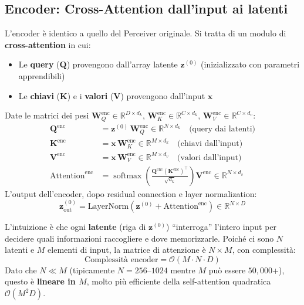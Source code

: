 \documentclass[12pt,a4paper]{article}
\begin{document}
\subsection{Encoder: Cross-Attention dall'input ai latenti}

L'encoder \`e identico a quello del Perceiver originale. Si tratta di un modulo di \textbf{cross-attention} in cui:
\begin{itemize}
    \item Le \textbf{query} ($\mathbf{Q}$) provengono dall'array latente $\mathbf{z}^{(0)}$ (inizializzato con parametri apprendibili)
    \item Le \textbf{chiavi} ($\mathbf{K}$) e i \textbf{valori} ($\mathbf{V}$) provengono dall'input $\mathbf{x}$
\end{itemize}

\begin{formulabox}
Date le matrici dei pesi $\mathbf{W}_Q^{\text{enc}} \in \mathbb{R}^{D \times d_k}$, $\mathbf{W}_K^{\text{enc}} \in \mathbb{R}^{C \times d_k}$, $\mathbf{W}_V^{\text{enc}} \in \mathbb{R}^{C \times d_v}$:
\begin{align}
    \mathbf{Q}^{\text{enc}} &= \mathbf{z}^{(0)} \, \mathbf{W}_Q^{\text{enc}} \in \mathbb{R}^{N \times d_k} \quad \text{(query dai latenti)} \\
    \mathbf{K}^{\text{enc}} &= \mathbf{x} \, \mathbf{W}_K^{\text{enc}} \in \mathbb{R}^{M \times d_k} \quad \text{(chiavi dall'input)} \\
    \mathbf{V}^{\text{enc}} &= \mathbf{x} \, \mathbf{W}_V^{\text{enc}} \in \mathbb{R}^{M \times d_v} \quad \text{(valori dall'input)} \\[6pt]
    \text{Attention}^{\text{enc}} &= \operatorname{softmax}\!\left(\frac{\mathbf{Q}^{\text{enc}} (\mathbf{K}^{\text{enc}})^\top}{\sqrt{d_k}}\right) \mathbf{V}^{\text{enc}} \in \mathbb{R}^{N \times d_v}
\end{align}
L'output dell'encoder, dopo residual connection e layer normalization:
\[
\mathbf{z}^{(0)}_{\text{out}} = \text{LayerNorm}\!\left(\mathbf{z}^{(0)} + \text{Attention}^{\text{enc}}\right) \in \mathbb{R}^{N \times D}
\]
\end{formulabox}

L'intuizione \`e che ogni \textbf{latente} (riga di $\mathbf{z}^{(0)}$) ``interroga'' l'intero input per decidere quali informazioni raccogliere e dove memorizzarle. Poich\'e ci sono $N$ latenti e $M$ elementi di input, la matrice di attenzione \`e $N \times M$, con complessit\`a:
\[
\text{Complessit\`a encoder} = \mathcal{O}(M \cdot N \cdot D)
\]
Dato che $N \ll M$ (tipicamente $N = 256$--$1024$ mentre $M$ pu\`o essere $50{,}000$+), questo \`e \textbf{lineare in $M$}, molto pi\`u efficiente della self-attention quadratica $\mathcal{O}(M^2 D)$.
\end{document}
